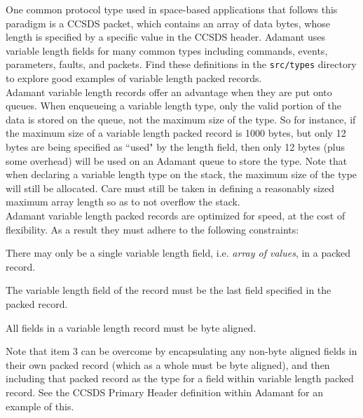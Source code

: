 One common protocol type used in space-based applications that follows this paradigm is a CCSDS packet, which contains an array of data bytes, whose length is specified by a specific value in the CCSDS header. Adamant uses variable length fields for many common types including commands, events, parameters, faults, and packets. Find these definitions in the \texttt{src/types} directory to explore good examples of variable length packed records. \\

Adamant variable length records offer an advantage when they are put onto queues. When enqueueing a variable length type, only the valid portion of the data is stored on the queue, not the maximum size of the type. So for instance, if the maximum size of a variable length packed record is 1000 bytes, but only 12 bytes are being specified as ``used" by the length field, then only 12 bytes (plus some overhead) will be used on an Adamant queue to store the type. Note that when declaring a variable length type on the stack, the maximum size of the type will still be allocated. Care must still be taken in defining a reasonably sized maximum array length so as to not overflow the stack. \\

Adamant variable length packed records are optimized for speed, at the cost of flexibility. As a result they must adhere to the following constraints:

\vspace{5mm} %
\begin{spacedenumerate}
  \item There may only be a single variable length field, i.e. \textit{array of values}, in a packed record.
  \item The variable length field of the record must be the last field specified in the packed record.
  \item All fields in a variable length record must be byte aligned. 
\end{spacedenumerate}
\vspace{5mm} %

Note that item 3 can be overcome by encapsulating any non-byte aligned fields in their own packed record (which as a whole must be byte aligned), and then including that packed record as the type for a field within variable length packed record. See the CCSDS Primary Header definition within Adamant for an example of this. \\

